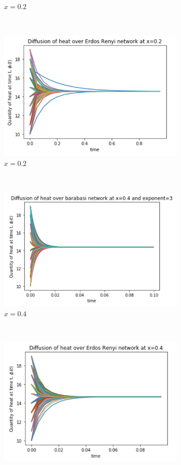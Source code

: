 \documentclass[10pt,a4paper]{article}
\begin{document}
\begin{figure}[H]
\begin{subfigure}[b]{0.45\textwidth}
		\caption{$x=0.2$}
		\label{barabasi-x02}
	\end{subfigure}~
	\begin{subfigure}[b]{0.45\textwidth}
		\includegraphics[width= \textwidth]{images/erdos-x02.png}
		\caption{$x=0.2$}
		\label{erdos-x02}
	\end{subfigure}\\
	\begin{subfigure}[b]{0.45\textwidth}
		\includegraphics[width= \textwidth]{images/barabasi-x04.png}
		\caption{$x=0.4$}
		\label{barabasi-x04}
	\end{subfigure}~
	\begin{subfigure}[b]{0.45\textwidth}
		\includegraphics[width= \textwidth]{images/erdos-x04.png}

\end{subfigure}
\end{figure}
\end{document}
